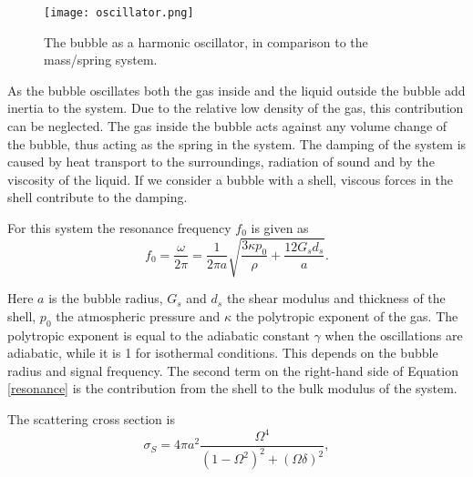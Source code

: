 \begin{figure}[h]
  \centering
  \texttt{[image: oscillator.png]}
  \caption{The bubble as a harmonic oscillator, in comparison to the mass/spring system\cite{Hoff2000}.}
  \label{Fig:oscillator}
\end{figure} 

As the bubble oscillates both the gas inside and the liquid outside the bubble add inertia to the system. Due to the relative low density of the gas, this contribution can be neglected. The gas inside the bubble acts against any volume change of the bubble, thus acting as the spring in the system. The damping of the system is caused by heat transport to the surroundings, radiation of sound and by the viscosity of the liquid. If we consider a bubble with a shell, viscous forces in the shell contribute to the damping. 

%
%

For this system the resonance frequency $f_0$ is given as \cite{Hoff2000}
\begin{equation}
\label{resonance}
f_0 = \frac{\omega}{2 \pi}= \frac{1}{2 \pi a} \sqrt{\frac{3\kappa p_0}{\rho}+ \frac{12 G_s d_s}{a}}.
\end{equation} 

Here $a$ is the bubble radius, $G_s$ and $d_s$ the shear modulus and thickness of the shell, $p_0$ the atmospheric pressure and $\kappa$ the polytropic exponent of the gas. The polytropic exponent is equal to the adiabatic constant $\gamma$ when the oscillations are adiabatic, while it is 1 for isothermal conditions. This depends on the bubble radius and signal frequency\cite{Hoff2000}. The second term on the right-hand side of Equation \eqref{resonance} is the contribution from the shell to the bulk modulus of the system. 

The scattering cross section is 
\begin{equation}
\label{eq:cross section}
\sigma_S = 4\pi a^2 \frac{\Omega^4}{(1-\Omega^2)^2 + (\Omega \delta)^2}, 
\end{equation}

